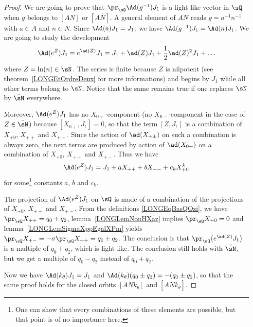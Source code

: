 \begin{proof}
	We are going to prove that $\pr_{\sQ}\Ad(g^{-1})J_1$ is a light like vector in $\sQ$ when $g$ belongs to $[AN]$ or $[A\bar N]$. A general element of $AN$ reads $g=a^{-1}n^{-1}$ with $a\in A$ and $n\in N$. Since $\Ad(a)J_1=J_1$, we have $\Ad(g^{-1})J_1=\Ad(n)J_1$. We are going to study the development
	\begin{equation}
		\Ad( e^{Z})J_1= e^{\ad(Z)}J_1=J_1+\ad(Z)J_1+\frac{ 1 }{2}\ad(Z)^2J_1+\ldots
	\end{equation}
	where $Z=\ln(n)\in\sN$. The series is finite because $Z$ is nilpotent (see theorem~\ref{LONGEtOrdreDeux} for more informations) and begins by $J_1$ while all other terms belong to $\sN$. Notice that the same remains true if one replaces $\sN$ by $\bar \sN$ everywhere.

	Moreover, $\Ad( e^{Z})J_1$ has no $X_{0+}$-component (no $X_{0-}$-component in the case of $Z\in\bar\sN$) because $[X_{0+},J_1]=0$, so that the term $[Z,J_1]$ is a combination of $X_{+0}$, $X_{++}$ and $X_{+-}$.  Since the action of $\ad(X_{+\pm})$ on such a combination is always zero, the next terms are produced by action of $\ad(X_{0+})$ on a combination of $X_{+0}$, $X_{++}$ and $X_{+-}$. Thus we have
	\begin{equation}        \label{LONGEqAdanJUnabck}
		\Ad( e^{Z})J_1=J_1+aX_{++}+bX_{+-}+c_kX_{+0}^k
	\end{equation}
	for some\footnote{One can show that every combinations of these elements are possible, but that point is of no importance here.} constants $a$, $b$ and $c_k$.

	The projection of $\Ad( e^{Z})J_1$ on $\sQ$ is made of a combination of the projections of $X_{+0}$, $X_{++}$ and $X_{+-}$. From the definitions \eqref{LONGEqBasQQzi}, we have $\pr_{\sQ}X_{++}=q_0+q_2$, lemma~\ref{LONGLemNonHXaz} implies $\pr_{\sQ}X_{+0}=0$ and lemma~\ref{LONGLemSigmaXppEgalXPm} yields $\pr_{\sQ}X_{+-}=-\sigma\pr_{\sQ}X_{++}=q_0+q_2$. The conclusion is that $\pr_{\sQ}\big( e^{\ad(Z)}J_1\big)$ is a multiple of $q_0+q_2$, which is light like. The conclusion still holds with $\bar\sN$, but we get a multiple of $q_0-q_2$ instead of $q_0+q_2$.

	Now we have $\Ad(k_{\theta})J_1=J_1$ and $\Ad(k_{\theta})(q_0\pm q_2)=-(q_0\pm q_2)$, so that the same proof holds for the closed orbits $[ANk_{\theta}]$ and $[A\bar N k_{\theta}]$.
\end{proof}

